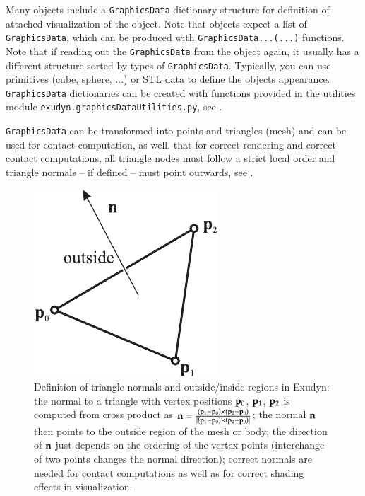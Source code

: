 Many objects include a \texttt{GraphicsData} dictionary structure for definition of attached visualization of the object.
Note that objects expect a list of \texttt{GraphicsData}, which can be produced with \texttt{GraphicsData...(...)} functions. Note that if reading out the \texttt{GraphicsData} from the object again, it usually has a different structure sorted by types of \texttt{GraphicsData}.
Typically, you can use primitives (cube, sphere, ...) or \ac{STL} data to define the objects appearance.
\texttt{GraphicsData} dictionaries can be created with functions provided in the utilities module \texttt{exudyn.graphicsDataUtilities.py}, see .

\texttt{GraphicsData} can be transformed into points and triangles (mesh) and can be used for contact computation, as well.
 that for correct rendering and correct contact computations, all triangle nodes must follow a strict local order and triangle normals -- if defined -- must point outwards, see .
\begin{figure}[tbh]%
\begin{center}
\includegraphics[width=0.25\columnwidth]{figures/triangleNormal}%
\end{center}
\caption{Definition of triangle normals and outside/inside regions in Exudyn: the normal to a triangle with vertex positions $\mathbf{p}_0$, $\mathbf{p}_1$, $\mathbf{p}_2$ is computed from cross product as $\mathbf{n} = \frac{(\mathbf{p}_1-\mathbf{p}_0) \times (\mathbf{p}_2-\mathbf{p}_0)}{|(\mathbf{p}_1-\mathbf{p}_0) \times (\mathbf{p}_2-\mathbf{p}_0)|}$;
the normal $\mathbf{n}$ then points to the outside region of the mesh or body; the direction of $\mathbf{n}$ just depends on the ordering of the vertex points (interchange of two points changes the normal direction); correct normals are needed for contact computations as well as for correct shading effects in visualization.}%
\label{fig:triangleNormals}%
\end{figure}

